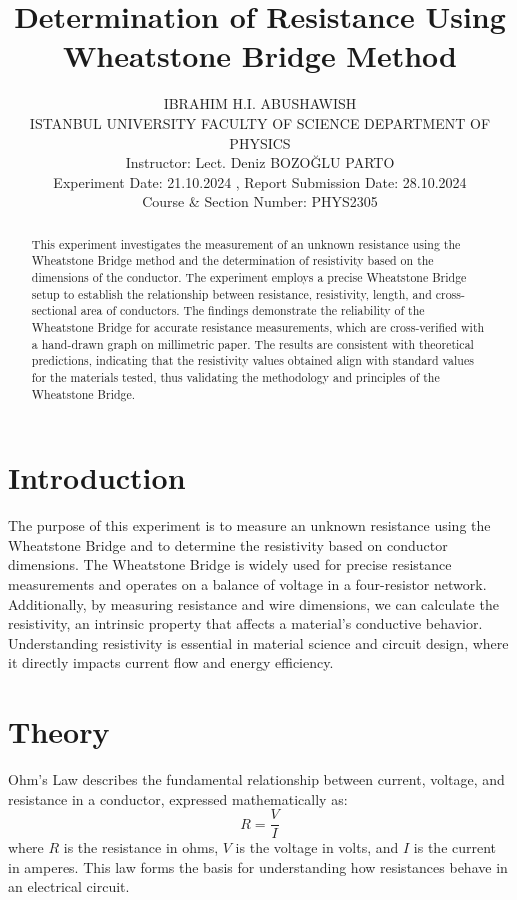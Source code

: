 \documentclass[journal]{IEEEtran}
\begin{document}
\title{Determination of Resistance Using Wheatstone Bridge Method}
\author{IBRAHIM H.I. ABUSHAWISH\\
ISTANBUL UNIVERSITY FACULTY OF SCIENCE 
DEPARTMENT OF PHYSICS\\
Instructor: Lect. Deniz BOZOĞLU PARTO\\
Experiment Date: 21.10.2024 , Report Submission Date: 28.10.2024\\
Course \& Section Number: PHYS2305}

\maketitle

\begin{abstract}
    This experiment investigates the measurement of an unknown resistance using the Wheatstone Bridge method and the determination of resistivity based on the dimensions of the conductor. The experiment employs a precise Wheatstone Bridge setup to establish the relationship between resistance, resistivity, length, and cross-sectional area of conductors. The findings demonstrate the reliability of the Wheatstone Bridge for accurate resistance measurements, which are cross-verified with a hand-drawn graph on millimetric paper. The results are consistent with theoretical predictions, indicating that the resistivity values obtained align with standard values for the materials tested, thus validating the methodology and principles of the Wheatstone Bridge.
\end{abstract}
    

\section{Introduction}
The purpose of this experiment is to measure an unknown resistance using the Wheatstone Bridge and to determine the resistivity based on conductor dimensions. The Wheatstone Bridge is widely used for precise resistance measurements and operates on a balance of voltage in a four-resistor network. Additionally, by measuring resistance and wire dimensions, we can calculate the resistivity, an intrinsic property that affects a material's conductive behavior. Understanding resistivity is essential in material science and circuit design, where it directly impacts current flow and energy efficiency.
\section{Theory}
Ohm’s Law describes the fundamental relationship between current, voltage, and resistance in a conductor, expressed mathematically as:
\begin{equation}
    R = \frac{V}{I}
    \label{eq:ohmslaw}
\end{equation}
where \( R \) is the resistance in ohms, \( V \) is the voltage in volts, and \( I \) is the current in amperes. This law forms the basis for understanding how resistances behave in an electrical circuit.
\end{document}

